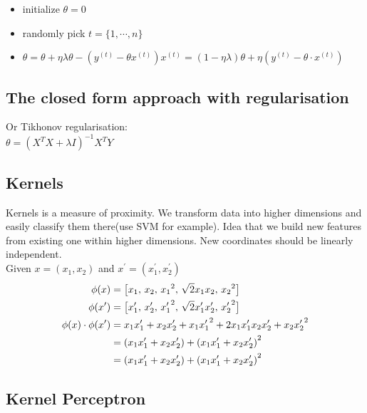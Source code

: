 \begin{itemize}
\item initialize $\theta=0$
\item randomly pick $t=\{1,\cdots,n\}$
\item $\theta = \theta + \eta\lambda \theta - (y^{(t)}-\theta x^{(t)})x^{(t)} = (1-\eta \lambda)\theta + \eta(y^{(t)}-\theta \cdot x^{(t)})$
\end{itemize} 


\subsection{The closed form approach with regularisation}
Or Tikhonov regularisation:\\
$\theta = (X^T X + \lambda I)^{-1} X^T Y$



\subsection{Kernels}

Kernels is a measure of proximity. We transform data into higher dimensions and easily classify
them there(use SVM for example). Idea that we build new features from existing one within higher dimensions.
New coordinates should be linearly independent.\\

Given $x=(x_1, x_2)$ and $x^\prime =(x_1^\prime , x_2^\prime )$
\begin{align*}
\displaystyle  \phi (x) \displaystyle &= \big [x_1, \, x_2,\,  {x_1}^2,\,  \sqrt{2}x_1x_2,\,  {x_2}^2 \big ]\\
\displaystyle \phi (x') \displaystyle &= \big [x_1^\prime ,\,  x_2^\prime ,\,  {x_1^\prime }^2,\,  \sqrt{2}x_1^\prime x_2^\prime ,\,  {x_2^\prime }^2 \big ]\\
\displaystyle  \phi (x) \cdot \phi (x^\prime )&=\displaystyle {x_1}{x_1^\prime } + {x_2}{x_2^\prime } + {x_1x_1^\prime }^2 + 2{x_1}{x_1^\prime }{x_2}{x_2^\prime } + {x_2x_2^\prime }^2\\
&=\displaystyle \left({x_1}{x_1^\prime } + {x_2}{x_2^\prime }\right)+ \left({x_1}{x_1^\prime } + {x_2}{x_2^\prime }\right)^2\\
&=\displaystyle \left({x_1}{x_1^\prime } + {x_2}{x_2^\prime }\right)+ \left({x_1}{x_1^\prime } + {x_2}{x_2^\prime }\right)^2
\end{align*}



\subsection{Kernel Perceptron}

